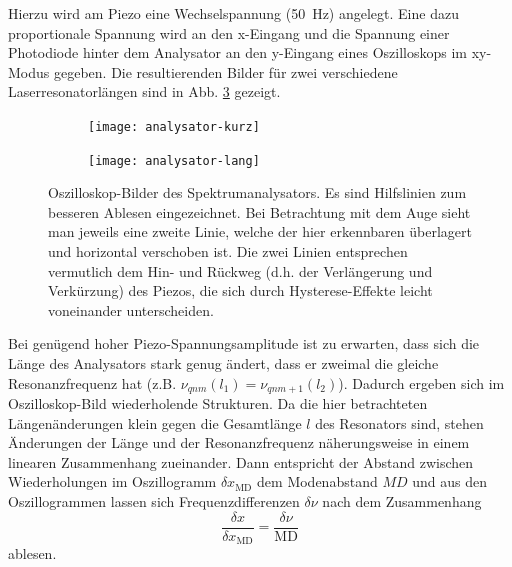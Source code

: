 \documentclass{article}
\newcommand{\mr}{\mathrm}
\begin{document}
Hierzu wird am Piezo eine Wechselspannung (\SI{50}{\Hz}) angelegt.
Eine dazu proportionale Spannung wird an den x-Eingang und die Spannung einer Photodiode hinter
dem Analysator an den y-Eingang eines Oszilloskops im xy-Modus gegeben.
Die resultierenden Bilder für zwei verschiedene Laserresonatorlängen sind in Abb. \ref{fig:analysator} gezeigt.
\begin{figure}[h]
  \centering
  \begin{subfigure}{0.49\textwidth}
    \centering
    \texttt{[image: analysator-kurz]}
    \label{fig:analysator-kurz}
  \end{subfigure}
  \hfill
  \begin{subfigure}{0.49\textwidth}
    \centering
    \texttt{[image: analysator-lang]}
    \label{fig:analysator-lang}
  \end{subfigure}
  \caption{
    Oszilloskop-Bilder des Spektrumanalysators. Es sind Hilfslinien zum besseren Ablesen eingezeichnet.
    Bei Betrachtung mit dem Auge sieht man jeweils eine zweite Linie,
    welche der hier erkennbaren überlagert und horizontal verschoben ist.
    Die zwei Linien entsprechen vermutlich dem Hin- und Rückweg (d.h. der Verlängerung und Verkürzung) des Piezos, die sich
    durch Hysterese-Effekte leicht voneinander unterscheiden.}
  \label{fig:analysator}
\end{figure}
Bei genügend hoher Piezo-Spannungsamplitude ist zu erwarten, dass sich die Länge des Analysators stark genug ändert,
dass er zweimal die gleiche Resonanzfrequenz hat (z.B. $\nu_{qnm}(l_1) = \nu_{qnm+1}(l_2)$).
Dadurch ergeben sich im Oszilloskop-Bild wiederholende Strukturen. Da die hier betrachteten Längenänderungen klein
gegen die Gesamtlänge $l$ des Resonators sind, stehen Änderungen der Länge und der Resonanzfrequenz näherungsweise
in einem linearen Zusammenhang zueinander. Dann entspricht der Abstand zwischen Wiederholungen im Oszillogramm $\delta x_\mr{MD}$
dem Modenabstand $MD$ und aus den Oszillogrammen lassen sich Frequenzdifferenzen $\delta\nu$ nach dem Zusammenhang
\begin{equation}
  \frac{\delta x}{\delta x_\mr{MD}} = \frac{\delta \nu}{\mr{MD}} \label{eq:analyser-md-ratio}
\end{equation}
ablesen.
\end{document}
